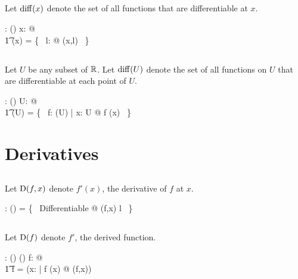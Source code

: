 \documentclass[11pt, oneside]{article}
\begin{document}
\subsection{}

Let $\operatorname{diff}(x)$ denote the set of all functions that are differentiable at $x$.

\begin{axdef}
	\diffR: \R \fun \power(\R \pfun \R)
\where
	\forall x: \R @ \\
	\t1	\diffR(x) = \bigcup \{~ l: \R @ \diffRR(x,l) ~\}
\end{axdef}

\subsection{}

Let $U$ be any subset of $\mathbb{R}$. 
Let $\operatorname{diff}(U)$ denote the set of all functions on $U$
that are differentiable at each point of $U$.

\begin{axdef}
	\diffPR: \power \R \fun \power(\R \pfun \R)
\where
	\forall U: \power \R @ \\
	\t1	\diffPR(U) = \{~ f: \CzeroPR(U) | \forall x: U @ f \in \diffR(x) ~\}
\end{axdef}

\section{Derivatives}

\subsection{}

Let $\operatorname{D}(f,x)$ denote $f'(x)$, the derivative of $f$ at $x$.

\begin{axdef}
	\derivFR: (\R \pfun \R) \cross \R \pfun \R
\where
	\derivFR = \{~ Differentiable @ (f,x) \mapsto l ~\}
\end{axdef}

\subsection{}

Let $\operatorname{D}(f)$ denote $f'$, the derived function.

\begin{axdef}
	\derivF: (\R \pfun \R) \fun (\R \pfun \R)
\where
	\forall f: \R \pfun \R @ \\
		\t1	\derivF f = (\lambda x: \R | f \in \diffR(x) @ \derivFR(f,x)) 
\end{axdef}
\end{document}
